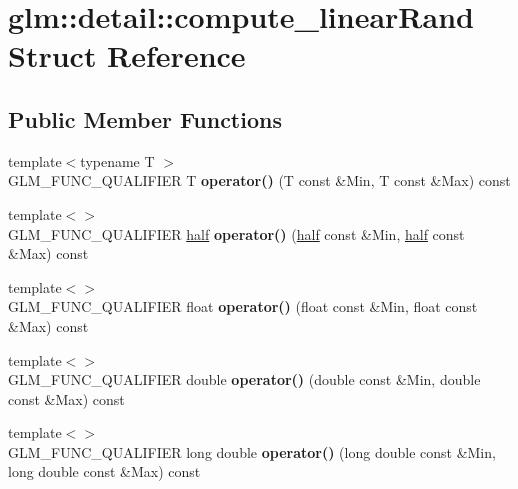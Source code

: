 \hypertarget{structglm_1_1detail_1_1compute__linearRand}{\section{glm\-:\-:detail\-:\-:compute\-\_\-linear\-Rand Struct Reference}
\label{structglm_1_1detail_1_1compute__linearRand}
}
\subsection*{Public Member Functions}
\begin{DoxyCompactItemize}
\item 
\hypertarget{structglm_1_1detail_1_1compute__linearRand_ac852e16d66ba80ff5309238b3f494b99}{{\footnotesize template$<$typename T $>$ }\\G\-L\-M\-\_\-\-F\-U\-N\-C\-\_\-\-Q\-U\-A\-L\-I\-F\-I\-E\-R T {\bfseries operator()} (T const \&Min, T const \&Max) const }\label{structglm_1_1detail_1_1compute__linearRand_ac852e16d66ba80ff5309238b3f494b99}

\item 
\hypertarget{structglm_1_1detail_1_1compute__linearRand_a544b94bdfbdcf46c2689208e75f85612}{{\footnotesize template$<$$>$ }\\G\-L\-M\-\_\-\-F\-U\-N\-C\-\_\-\-Q\-U\-A\-L\-I\-F\-I\-E\-R \hyperlink{classglm_1_1detail_1_1half}{half} {\bfseries operator()} (\hyperlink{classglm_1_1detail_1_1half}{half} const \&Min, \hyperlink{classglm_1_1detail_1_1half}{half} const \&Max) const }\label{structglm_1_1detail_1_1compute__linearRand_a544b94bdfbdcf46c2689208e75f85612}

\item 
\hypertarget{structglm_1_1detail_1_1compute__linearRand_aeb6d4f603a9afa05544d65233064f2e9}{{\footnotesize template$<$$>$ }\\G\-L\-M\-\_\-\-F\-U\-N\-C\-\_\-\-Q\-U\-A\-L\-I\-F\-I\-E\-R float {\bfseries operator()} (float const \&Min, float const \&Max) const }\label{structglm_1_1detail_1_1compute__linearRand_aeb6d4f603a9afa05544d65233064f2e9}

\item 
\hypertarget{structglm_1_1detail_1_1compute__linearRand_a60dd37b36082f1a8dbfb8d34f0d5575c}{{\footnotesize template$<$$>$ }\\G\-L\-M\-\_\-\-F\-U\-N\-C\-\_\-\-Q\-U\-A\-L\-I\-F\-I\-E\-R double {\bfseries operator()} (double const \&Min, double const \&Max) const }\label{structglm_1_1detail_1_1compute__linearRand_a60dd37b36082f1a8dbfb8d34f0d5575c}

\item 
\hypertarget{structglm_1_1detail_1_1compute__linearRand_ab5433863c50ed60a1ce5ac941759428f}{{\footnotesize template$<$$>$ }\\G\-L\-M\-\_\-\-F\-U\-N\-C\-\_\-\-Q\-U\-A\-L\-I\-F\-I\-E\-R long double {\bfseries operator()} (long double const \&Min, long double const \&Max) const }\label{structglm_1_1detail_1_1compute__linearRand_ab5433863c50ed60a1ce5ac941759428f}

\end{DoxyCompactItemize}



